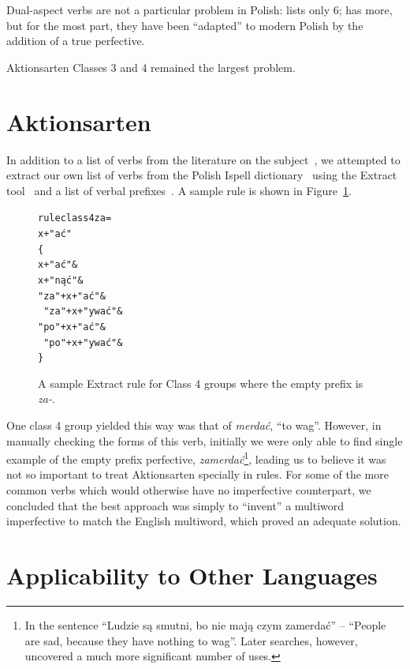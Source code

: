 \documentclass[11pt]{article}
\begin{document}
Dual-aspect verbs are not a particular problem in Polish: \cite{jagod} 
lists only 6; \cite{futrega} has more, but for the most part, they
have been ``adapted'' to modern Polish by the addition of a true
perfective.

Aktionsarten Classes 3 and 4 remained the largest problem.

\section{Aktionsarten}

In addition to a list of verbs from the literature on the 
subject~\citep{aalstein07}, we attempted to extract our own list of verbs
from the Polish Ispell dictionary~\citep{futrega} using the Extract
tool~\citep{forsberg07} and a list of verbal prefixes~\citep[5.15.2]{bielec}.
A sample rule is shown in Figure~\ref{figure:extract}.

\begin{figure}[htbp]
\begin{small}
\begin{alltt}
rule class4za = 
x+"ać"
\{ 
  x+"ać" \&
  x+"nąć" \&
  "za"+x+"ać" \&
  ~"za"+x+"ywać" \&
  "po"+x+"ać" \&
  ~"po"+x+"ywać" \&
\}
\end{alltt}
\end{small}
\caption{A sample Extract rule for Class 4 groups where the
empty prefix is {\it za-}.}
\label{figure:extract}
\end{figure}

One class 4 group yielded this way was that of {\it merda\'{c}},
``to wag''. However, in manually checking the forms of this verb,
initially we were only able to find single example of the empty prefix 
perfective, {\it zamerda\'{c}}\footnote{In the sentence ``Ludzie s\k{a}
smutni, bo nie maj\k{a} czym zamerda\'{c}'' -- ``People are sad, because
they have nothing to wag''. Later searches, however, uncovered a much 
more significant number of uses.}, leading us to believe it was not so
important to treat Aktionsarten specially in rules. For some of
the more common verbs which would otherwise have no imperfective
counterpart, we concluded that the best approach was simply to ``invent'' 
a multiword imperfective to match the English multiword, which
proved an adequate solution.

\section{Applicability to Other Languages}
\end{document}
